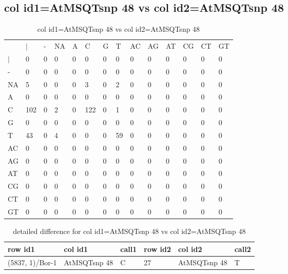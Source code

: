\subsection{col id1=AtMSQTsnp 48 vs col id2=AtMSQTsnp 48}
\begin{center}
\begin{longtable}{|l|l|l|l|l|l|l|l|l|l|l|l|l|l|}
\caption{col id1=AtMSQTsnp 48 vs col id2=AtMSQTsnp 48} \label{table_dm938}\\
\hline
\\
\hline
&$|$&-&NA&A&C&G&T&AC&AG&AT&CG&CT&GT\\
$|$&0&0&0&0&0&0&0&0&0&0&0&0&0\\
-&0&0&0&0&0&0&0&0&0&0&0&0&0\\
NA&5&0&0&0&3&0&2&0&0&0&0&0&0\\
A&0&0&0&0&0&0&0&0&0&0&0&0&0\\
C&102&0&2&0&122&0&1&0&0&0&0&0&0\\
G&0&0&0&0&0&0&0&0&0&0&0&0&0\\
T&43&0&4&0&0&0&59&0&0&0&0&0&0\\
AC&0&0&0&0&0&0&0&0&0&0&0&0&0\\
AG&0&0&0&0&0&0&0&0&0&0&0&0&0\\
AT&0&0&0&0&0&0&0&0&0&0&0&0&0\\
CG&0&0&0&0&0&0&0&0&0&0&0&0&0\\
CT&0&0&0&0&0&0&0&0&0&0&0&0&0\\
GT&0&0&0&0&0&0&0&0&0&0&0&0&0\\
\hline
\end{longtable}
\end{center}

\begin{center}
\begin{longtable}{|l|l|l|l|l|l|}
\caption{detailed difference for col id1=AtMSQTsnp 48 vs col id2=AtMSQTsnp 48} \label{table_dm939}\\
\hline
row id1&col id1&call1&row id2&col id2&call2\\
\hline
(5837, 1)/Bor-1&AtMSQTsnp 48&C&27&AtMSQTsnp 48&T\\
\hline
\end{longtable}
\end{center}

